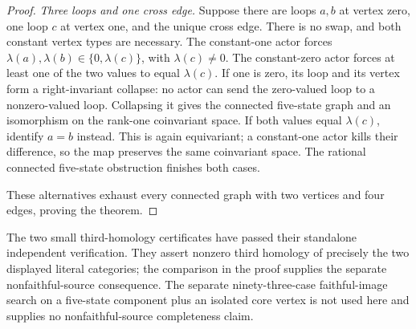 \begin{proof}
\emph{Three loops and one cross edge.}
Suppose there are loops $a,b$ at vertex zero, one loop
$c$ at vertex one, and the unique cross edge.
There is no swap, and both constant vertex types are
necessary. The constant-one actor forces
$\lambda(a),\lambda(b)\in\{0,\lambda(c)\}$,
with $\lambda(c)\ne0$. The constant-zero actor forces
at least one of the two values to equal $\lambda(c)$.
If one is zero, its loop and its vertex form a right-invariant
collapse: no actor can send the zero-valued loop to a
nonzero-valued loop. Collapsing it gives the connected
five-state graph and an isomorphism on the rank-one
coinvariant space. If both values equal $\lambda(c)$,
identify $a=b$ instead. This is again equivariant; a
constant-one actor kills their difference, so the map
preserves the same coinvariant space. The rational
connected five-state obstruction finishes both cases.

These alternatives exhaust every connected graph with
two vertices and four edges, proving the theorem.
\end{proof}

\begin{remark}
\label{C:right-zero-six-connected-control-scope}
The two small third-homology certificates have passed their
standalone independent verification. They assert nonzero
third homology of precisely the two displayed literal
categories; the comparison in the proof supplies the
separate nonfaithful-source consequence.
The separate ninety-three-case faithful-image search on a
five-state component plus an isolated core vertex is not used
here and supplies no nonfaithful-source completeness claim.
\end{remark}
